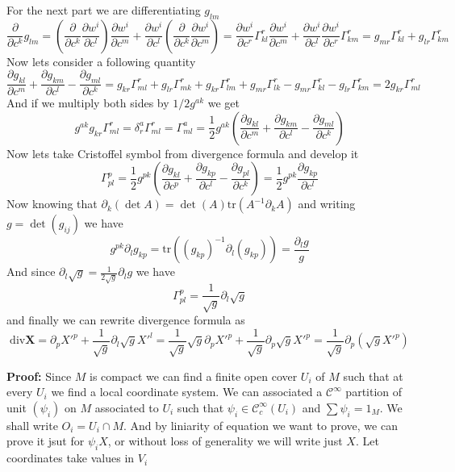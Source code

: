 For the next part we are differentiating $g_{lm}$
\[\frac{\partial}{\partial c^k}g_{lm}=(\frac{\partial}{\partial c^k}\frac{\partial w^i}{\partial c^l})\frac{\partial w^i}{\partial c^m}
+\frac{\partial w^i}{\partial c^l}(\frac{\partial}{\partial c^k}\frac{\partial w^i}{\partial c^m})
=\frac{\partial w^i}{\partial c^r}\Gamma^r_{kl}\frac{\partial w^i}{\partial c^m}+
\frac{\partial w^i}{\partial c^l}\frac{\partial w^i}{\partial c^r}\Gamma^r_{km}
=g_{mr}\Gamma^r_{kl}+g_{lr}\Gamma^r_{km}\]
Now lets consider a following quantity
\[\frac{\partial g_{kl}}{\partial c^m}+\frac{\partial g_{km}}{\partial c^l}-\frac{\partial g_{ml}}{\partial c^k}
=g_{kr}\Gamma^r_{ml}+g_{lr}\Gamma^r_{mk}+g_{kr}\Gamma^r_{lm}+g_{mr}\Gamma^r_{lk}-g_{mr}\Gamma^r_{kl}-g_{lr}\Gamma^r_{km}=2g_{kr}\Gamma^r_{ml}
\]
And if we multiply both sides by $1/2g^{ak}$ we get
\[g^{ak}g_{kr}\Gamma^r_{ml}=\delta_r^a\Gamma^r_{ml}=\Gamma^a_{ml}=\frac{1}{2}g^{ak}(\frac{\partial g_{kl}}{\partial c^m}+\frac{\partial g_{km}}{\partial c^l}-\frac{\partial g_{ml}}{\partial c^k})\]
Now lets take Cristoffel symbol from divergence formula and develop it
\[\Gamma^p_{pl}=\frac{1}{2}g^{pk}(\frac{\partial g_{kl}}{\partial c^p}+\frac{\partial g_{kp}}{\partial c^l}-\frac{\partial g_{pl}}{\partial c^k})
=\frac{1}{2}g^{pk}\frac{\partial g_{kp}}{\partial c^l}\]
Now knowing that $\partial_k(\det A)=\det(A)\text{tr}(A^{-1}\partial_k A)$ and
writing $g=\det(g_{ij})$ we have
\[g^{pk}\partial_l g_{kp}=\text{tr}((g_{kp})^{-1}\partial_l(g_{kp}))=\frac{\partial_l g}{g}\]
And since $\partial_l\sqrt g=\frac{1}{2\sqrt g}\partial_l g$ we have
\[\Gamma^p_{pl}=\frac{1}{\sqrt g}\partial_l\sqrt g\]
and finally we can rewrite divergence formula as
\[\text{div}\mathbf X=\partial_p X'^p+\frac{1}{\sqrt g}\partial_l\sqrt g X'^l
=\frac{1}{\sqrt g}\sqrt g\partial_p X'^p+\frac{1}{\sqrt g}\partial_p\sqrt g X'^p
=\frac{1}{\sqrt g}\partial_p(\sqrt g X'^p)
\]

\vspace{1ex}
\textbf{Proof:}
Since $M$ is compact we can find a finite open cover $U_i$ of
$M$ such that at every $U_i$ we find a local coordinate system. We can associated
a $\mathcal C^\infty$ partition of unit $(\psi_i)$ on $M$ associated to $U_i$ such
that $\psi_i\in\mathcal C^\infty_c(U_i)$ and $\sum\psi_i=1_M$. We shall write
$O_i=U_i\cap M$. And by liniarity of equation we want to prove, we can prove it
jsut for $\psi_iX$, or without loss of generality we will write just $X$. Let
coordinates take values in $V_i$

